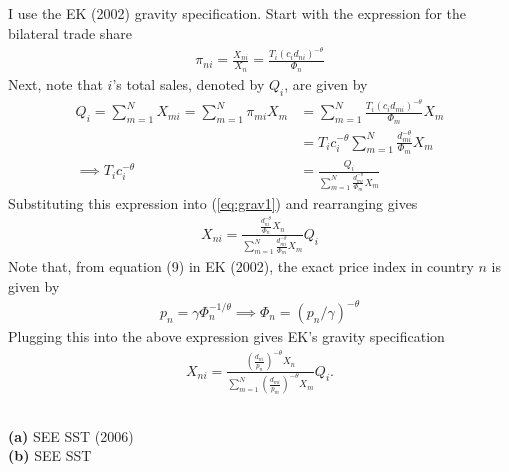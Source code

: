 \documentclass[12pt]{article}
\begin{document}
\subsection{} I use the EK (2002) gravity specification. Start with the expression for the bilateral trade share
\begin{align}
\pi_{ni} = \frac{X_{ni}}{X_n}= \frac{T_i (c_i d_{ni})^{-\theta}}{\Phi_n} \label{eq:grav1}
\end{align}
Next, note that $i$'s total sales, denoted by $Q_i$, are given by
\begin{align*}
Q_i = \sum_{m=1}^N X_{mi} = \sum_{m=1}^N  \pi_{mi}X_m &=   \sum_{m=1}^N\frac{T_i (c_i d_{mi})^{-\theta}}{\Phi_m} X_m\\
&= T_ic_i^{-\theta} \sum_{m=1}^N\frac{ d_{mi}^{-\theta}}{\Phi_m} X_m\\
\implies  T_ic_i^{-\theta} &= \frac{Q_i}{ \sum_{m=1}^N\frac{ d_{mi}^{-\theta}}{\Phi_m} X_m}
\end{align*}
Substituting this expression into (\ref{eq:grav1}) and rearranging gives
\begin{align*}
X_{ni} = \frac{\frac{d_{ni}^{-\theta}}{\Phi_n}X_n}{ \sum_{m=1}^N\frac{ d_{mi}^{-\theta}}{\Phi_m} X_m}Q_i
\end{align*}
Note that, from equation (9) in EK (2002), the exact price index in country $n$ is given by
\begin{align*}
p_n = \gamma \Phi_n ^{-1/\theta} \implies \Phi_n = (p_n/\gamma)^{-\theta}
\end{align*}
Plugging this into the above expression gives EK's gravity specification
\begin{align}
X_{ni} =\frac{\left(\frac{d_{ni}}{p_n}\right)^{-\theta}X_n}{ \sum_{m=1}^N\left(\frac{d_{mi}}{p_m}\right)^{-\theta} X_m}Q_i \label{eq:grav2}.
\end{align}

\subsection{}
\textbf{(a)} SEE SST (2006)\\

\textbf{(b)} SEE SST \\
\end{document}
